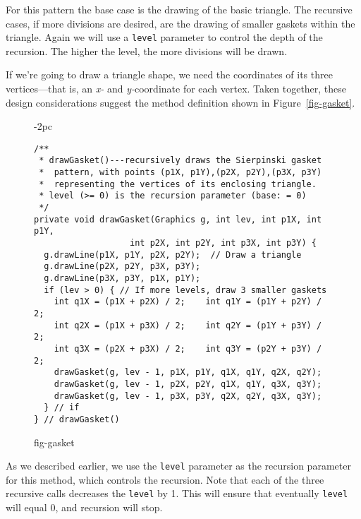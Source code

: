 \noindent For this pattern the base case is the drawing of the
basic triangle.  The recursive cases, if more divisions are desired,
are the drawing of smaller gaskets within the triangle.  Again we will
use a {\tt level} parameter to control the depth of the recursion.  The
higher the level, the more divisions will be drawn.



If we're going to draw a triangle shape, we need the coordinates of
its three vertices---that is, an {\it x-} and {\it y-}coordinate for each
vertex.  Taken
together, these design considerations suggest the method definition
shown in Figure~\ref{fig-gasket}.

\begin{figure}[tb]
\jjjprogstart
\begin{jjjlistingleft}[28pc]{-2pc}
\begin{lstlisting}
/**
 * drawGasket()---recursively draws the Sierpinski gasket
 *  pattern, with points (p1X, p1Y),(p2X, p2Y),(p3X, p3Y) 
 *  representing the vertices of its enclosing triangle.
 * level (>= 0) is the recursion parameter (base: = 0)
 */
private void drawGasket(Graphics g, int lev, int p1X, int p1Y,
                   int p2X, int p2Y, int p3X, int p3Y) {
  g.drawLine(p1X, p1Y, p2X, p2Y);  // Draw a triangle
  g.drawLine(p2X, p2Y, p3X, p3Y);
  g.drawLine(p3X, p3Y, p1X, p1Y);
  if (lev > 0) { // If more levels, draw 3 smaller gaskets
    int q1X = (p1X + p2X) / 2;    int q1Y = (p1Y + p2Y) / 2;
    int q2X = (p1X + p3X) / 2;    int q2Y = (p1Y + p3Y) / 2;
    int q3X = (p2X + p3X) / 2;    int q3Y = (p2Y + p3Y) / 2;
    drawGasket(g, lev - 1, p1X, p1Y, q1X, q1Y, q2X, q2Y);
    drawGasket(g, lev - 1, p2X, p2Y, q1X, q1Y, q3X, q3Y);
    drawGasket(g, lev - 1, p3X, p3Y, q2X, q2Y, q3X, q3Y);
  } // if
} // drawGasket()
\end{lstlisting}
\end{jjjlistingleft}
{fig-gasket}
\end{figure}

As we described earlier, we use the {\tt level} parameter
as the recursion parameter for this method, which controls the
recursion.  Note that each of the three recursive calls decreases the
{\tt level} by 1. This will ensure that eventually {\tt level} will
equal 0, and recursion will stop.

